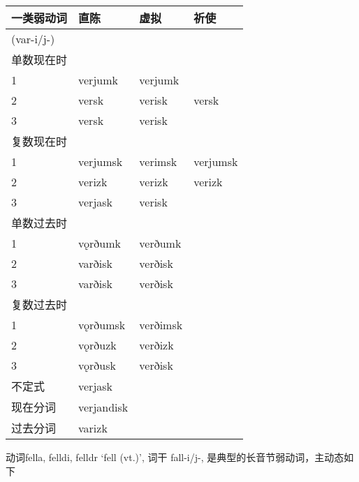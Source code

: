 \begin{longtable}{llll}
  \toprule
  一类弱动词      & 直陈         & 虚拟       & 祈使       \\
  \midrule
  \endhead
  \bottomrule
  \endfoot
  (var-i/j-) &            &          &          \\
  单数现在时      &            &          &          \\
  1          & verjumk    & verjumk  &          \\
  2          & versk      & verisk   & versk    \\
  3          & versk      & verisk   &          \\
  复数现在时      &            &          &          \\
  1          & verjumsk   & verimsk  & verjumsk \\
  2          & verizk     & verizk   & verizk   \\
  3          & verjask    & verisk   &          \\
  单数过去时      &            &          &          \\
  1          & vǫrðumk    & verðumk  &          \\
  2          & varðisk    & verðisk  &          \\
  3          & varðisk    & verðisk  &          \\
  复数过去时      &            &          &          \\
  1          & vǫrðumsk   & verðimsk &          \\
  2          & vǫrðuzk    & verðizk  &          \\
  3          & vǫrðusk    & verðisk  &          \\
  不定式        & verjask    &          &          \\
  现在分词       & verjandisk &          &          \\
  过去分词       & varizk     &          &          \\
\end{longtable}

动词fella, felldi, felldr `fell (vt.)‌', 词干 fall-i/j-,
是典型的长音节弱动词，主动态如下

